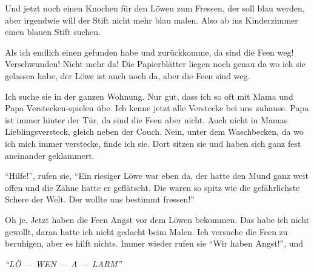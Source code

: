 Und jetzt noch einen Knochen für den Löwen zum Fressen, der soll blau werden, aber irgendwie will der Stift nicht mehr blau malen. Also ab ins Kinderzimmer einen blauen Stift suchen.

Als ich endlich einen gefunden habe und zurückkomme, da sind die Feen weg! Verschwunden! Nicht mehr da! Die Papierblätter liegen noch genau da wo ich sie gelassen habe, der Löwe ist auch noch da, aber die Feen sind weg.

Ich suche sie in der ganzen Wohnung. Nur gut, dass ich so oft mit Mama und Papa Verstecken-spielen übe. Ich kenne jetzt alle Verstecke bei uns zuhause. Papa ist immer hinter der Tür, da sind die Feen aber nicht. Auch nicht in Mamas Lieblingsversteck, gleich neben der Couch. Nein, unter dem Waschbecken, da wo ich mich immer verstecke, finde ich sie. Dort sitzen sie und haben sich ganz fest aneinander geklammert.

\enquote{Hilfe!}, rufen sie, \enquote{Ein riesiger Löwe war eben da, der hatte den Mund ganz weit offen und die Zähne hatte er geflätscht. Die waren so spitz wie die gefährlichste Schere der Welt. Der wollte uns bestimmt fressen!}




Oh je. Jetzt haben die Feen Angst vor dem Löwen bekommen. Das habe ich nicht gewollt, daran hatte ich nicht gedacht beim Malen.  Ich versuche die Feen zu beruhigen, aber es hilft nichts. Immer wieder rufen sie \enquote{Wir haben Angst!}, und
\begin{center}
 {\color{DeepPink}
\large
\itshape
\enquote{LÖ --- WEN --- A --- LARM}}
\end{center}

